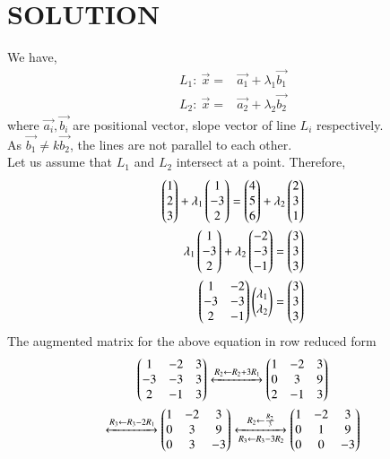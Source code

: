\documentclass[journal,12pt,twocolumn]{IEEEtran}
\begin{document}
\section*{SOLUTION}
We have,
\begin{align}
    \label{eq:3}                       
    L_{1}: \: \Vec{x}={}&\Vec{a_{1}}+\lambda_{1}\Vec{b_{1}}\\
    \label{eq:4}
    L_{2}: \: \Vec{x}={}&\Vec{a_{2}}+\lambda_{2}\Vec{b_{2}}
\end{align}
where $\Vec{a_{i}},\Vec{b_{i}}$ are positional vector, slope vector of line $L_{i}$ respectively.\\
As $\Vec{b_{1}}\neq k \Vec{b_{2}}$, the lines are not parallel to each other.
\\ Let us assume that $L_{1}$ and $L_{2}$ intersect at a point. Therefore,
\begin{align}
    \label{eq:5}
    \begin{pmatrix}1 \\ 2\\ 3 \end{pmatrix} +\lambda_{1}\begin{pmatrix}1 \\ -3 \\ 2\end{pmatrix} = \begin{pmatrix}4 \\ 5\\ 6\end{pmatrix} + \lambda_{2}\begin{pmatrix}2 \\ 3 \\ 1\end{pmatrix} \\
    \label{eq:6}
    \lambda_{1}\begin{pmatrix}1 \\ -3 \\ 2\end{pmatrix} + \lambda_{2}\begin{pmatrix}-2 \\ -3 \\ -1\end{pmatrix}= \begin{pmatrix}3 \\ 3\\ 3 \end{pmatrix} \\
    \label{eq:7}
    \begin{pmatrix}1 & -2\\ -3 &-3 \\ 2 & -1\end{pmatrix}\begin{pmatrix}\lambda_{1}\\ \lambda_{2}\end{pmatrix}=
    \begin{pmatrix}3 \\ 3\\ 3 \end{pmatrix}
\end{align}
The augmented matrix for the above equation in row reduced form
\begin{multline}
    \begin{pmatrix}1 & -2 & 3\\ -3 &-3 & 3\\ 2 & -1 & 3\end{pmatrix} \xleftrightarrow{R_{2}\leftarrow R_{2}+3R_{1}}
     \begin{pmatrix}1 & -2 & 3\\ 0 &3 & 9\\ 2 & -1 & 3\end{pmatrix}\\
     \xleftrightarrow{R_{3}\leftarrow R_{3}-2R_{1}}
     \begin{pmatrix}1 & -2 & 3\\ 0 &3 & 9\\ 0 & 3 & -3\end{pmatrix}
   \xleftrightarrow[R_{3}\leftarrow R_{3}-3R_{2}]{R_{2}\leftarrow\frac{R_{2}}{3}}
    \begin{pmatrix}1 & -2 & 3\\ 0 & 1 & 9\\ 0 & 0 & -3\end{pmatrix}
\end{multline}
\end{document}
